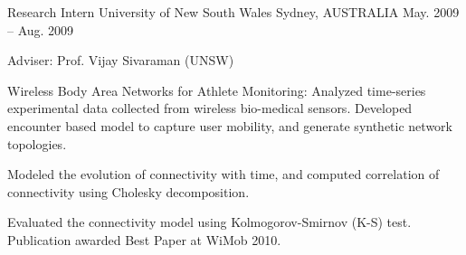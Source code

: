 \begin{cventries}
  \cventry
    {Research Intern} %
    {University of New South Wales} %
    {Sydney, AUSTRALIA} %
    {May. 2009 -- Aug. 2009} %
    {
      \begin{cvitems} %
      \item {Adviser: Prof. Vijay Sivaraman (UNSW)}
%      
      \item {Wireless Body Area Networks for Athlete Monitoring: Analyzed time-series experimental data collected from wireless bio-medical sensors. Developed encounter based model to capture user mobility, and generate synthetic network topologies.
      		}
      \item {Modeled the evolution of connectivity with time, and computed correlation of connectivity using Cholesky decomposition.}
      \item {Evaluated the connectivity model using Kolmogorov-Smirnov (K-S) test. Publication awarded Best Paper at WiMob 2010.}
    \end{cvitems}
    }

%    
\end{cventries}

